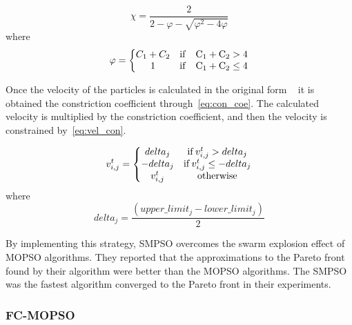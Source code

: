 \begin{equation} \label{eq:con_coe}
\chi = \frac{2}{2 -\varphi - \sqrt{\varphi^2 -4\varphi}}
\end{equation}
where
\begin{equation}
\varphi = \left\{ \begin{matrix}
    C_1 +C_2 & \rm{if} \quad C_1 +C_2 > 4 \\ 
    1 & \rm{if} \quad C_1 +C_2 \leq 4
\end{matrix} \right.
\end{equation}

Once the velocity of the particles is calculated in the original form ~\cite{nebro2009smpso} it is obtained the constriction coefficient through~\ref{eq:con_coe}. The calculated velocity is multiplied by the constriction coefficient, and then the velocity is constrained by~\ref{eq:vel_con}.

\begin{equation} \label{eq:vel_con}
v_{i, j}^t = \left\{ \begin{matrix}
    delta_j & {\rm if} \, v_{i,j}^t > delta_j\\
    -delta_j & {\rm if} \, v_{i,j}^t \leq -delta_j\\
    v_{i,j}^t & {\rm otherwise}
\end{matrix} \right.
\end{equation}
where
\begin{equation}
    delta_j = \frac{(upper\_limit_j -lower\_limit_j)}{2}
\end{equation}

By implementing this strategy, SMPSO overcomes the swarm explosion effect of MOPSO algorithms. They reported that the approximations to the Pareto front found by their algorithm were better than the MOPSO algorithms. The SMPSO was the fastest algorithm converged to the Pareto front in their experiments.

\subsubsection{FC-MOPSO}

